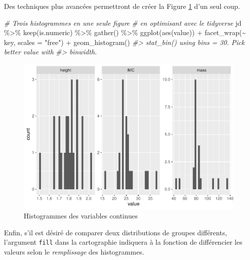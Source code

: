 \documentclass[
]{book}
\newenvironment{Shaded}{}{}
\newcommand{\AttributeTok}[1]{#1}
\newcommand{\CommentTok}[1]{\textit{#1}}
\newcommand{\FunctionTok}[1]{#1}
\newcommand{\NormalTok}[1]{#1}
\newcommand{\SpecialCharTok}[1]{#1}
\newcommand{\StringTok}[1]{#1}
\begin{document}
Des techniques plus avancées permettront de créer la Figure \ref{fig:hist} d'un seul coup.

\begin{Shaded}
\begin{Highlighting}[]
\CommentTok{\# Trois histogrammes en une seule figure}
\CommentTok{\# en optimisant avec le tidyverse}
\NormalTok{jd }\SpecialCharTok{\%\textgreater{}\%}
  \FunctionTok{keep}\NormalTok{(is.numeric) }\SpecialCharTok{\%\textgreater{}\%} 
  \FunctionTok{gather}\NormalTok{() }\SpecialCharTok{\%\textgreater{}\%} 
  \FunctionTok{ggplot}\NormalTok{(}\FunctionTok{aes}\NormalTok{(value)) }\SpecialCharTok{+}
  \FunctionTok{facet\_wrap}\NormalTok{(}\SpecialCharTok{\textasciitilde{}}\NormalTok{ key, }\AttributeTok{scales =} \StringTok{"free"}\NormalTok{) }\SpecialCharTok{+}
  \FunctionTok{geom\_histogram}\NormalTok{()}
\CommentTok{\#\textgreater{} \textasciigrave{}stat\_bin()\textasciigrave{} using \textasciigrave{}bins = 30\textasciigrave{}. Pick better value with}
\CommentTok{\#\textgreater{} \textasciigrave{}binwidth\textasciigrave{}.}
\end{Highlighting}
\end{Shaded}

\begin{figure}

{\centering \includegraphics[width=0.75\linewidth,height=0.75\textheight]{07-Visualiser_files/figure-latex/hist-1} 

}

\caption{Histogrammes des variables continues}\label{fig:hist}
\end{figure}

Enfin, s'il est désiré de comparer deux distributions de groupes différents, l'argument \texttt{fill} dans la cartographie indiquera à la fonction de différencier les valeurs selon le \emph{remplissage} des histogrammes.
\end{document}
